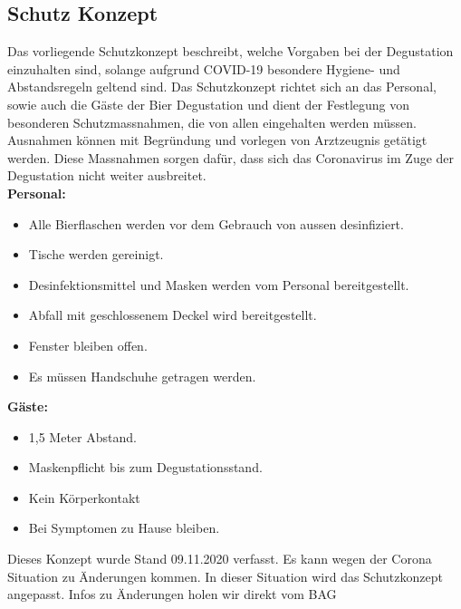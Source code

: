 \subsection{Schutz Konzept}
Das vorliegende Schutzkonzept beschreibt, welche Vorgaben bei der Degustation einzuhalten sind, solange aufgrund COVID-19 besondere Hygiene- und Abstandsregeln geltend sind. Das Schutzkonzept richtet sich an das Personal, sowie auch die Gäste der Bier Degustation und dient der Festlegung von besonderen Schutzmassnahmen, die von allen eingehalten werden müssen. Ausnahmen können mit Begründung und vorlegen von Arztzeugnis getätigt werden.
Diese Massnahmen sorgen dafür, dass sich das Coronavirus im Zuge der Degustation nicht weiter ausbreitet. 
\\
\textbf{Personal:}
\begin{itemize}
    \item Alle Bierflaschen werden vor dem Gebrauch von aussen desinfiziert.
    \item Tische werden gereinigt.
    \item Desinfektionsmittel und Masken werden vom Personal bereitgestellt.
    \item Abfall mit geschlossenem Deckel wird bereitgestellt.
    \item Fenster bleiben offen.
    \item Es müssen Handschuhe getragen werden.
\end{itemize}


\textbf{Gäste:}

\begin{itemize}
    \item 1,5 Meter Abstand.
    \item Maskenpflicht bis zum Degustationsstand.
    \item Kein Körperkontakt
    \item Bei Symptomen zu Hause bleiben.
\end{itemize}

Dieses Konzept wurde Stand 09.11.2020 verfasst.
Es kann wegen der Corona Situation zu Änderungen kommen. In dieser Situation wird das Schutzkonzept angepasst.
Infos zu Änderungen holen wir direkt vom BAG 


